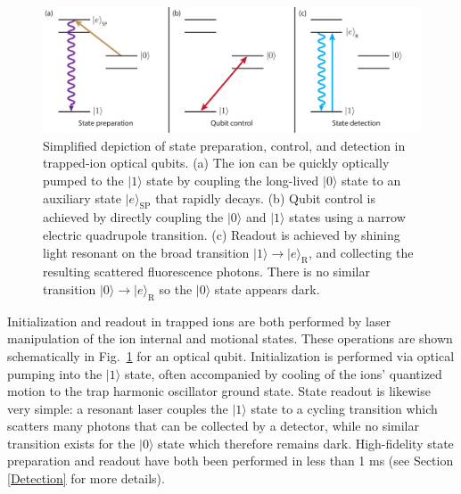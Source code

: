 \documentclass[%
12pt,
 amsmath,amssymb,
]{revtex4-2}
\newcommand{\zero}{|0 \rangle}
\newcommand{\one}{|1 \rangle}
\begin{document}
\begin{figure}[tp]
\includegraphics[width=0.9\columnwidth]{StatePrepv3.pdf}
\caption{Simplified depiction of state preparation, control, and detection in trapped-ion optical qubits. (a) The ion can be quickly optically pumped to the $\one$ state by coupling the long-lived $\zero$ state to an auxiliary state $|e\rangle_{\mathrm{SP}}$ that rapidly decays. (b) Qubit control is achieved by directly coupling the $\zero$ and $\one$ states using a narrow electric quadrupole transition. (c) Readout is achieved by shining light resonant on the broad transition $\one \rightarrow | e \rangle_{\mathrm{R}}$, and collecting the resulting scattered fluorescence photons. There is no similar transition $\zero \rightarrow | e \rangle_{\mathrm{R}}$ so the $\zero$ state appears dark.}
\label{fig:stateprep}
\end{figure}

Initialization and readout in trapped ions are both performed by laser manipulation of the ion internal and motional states. These operations are shown schematically in Fig.~\ref{fig:stateprep} for an optical qubit. Initialization is performed via optical pumping into the $\one$ state, often accompanied by cooling of the ions' quantized motion to the trap harmonic oscillator ground state.  State readout is likewise very simple: a resonant laser couples the $\one$ state to a cycling transition which scatters many photons that can be collected by a detector, while no similar transition exists for the $\zero$ state which therefore remains dark. High-fidelity state preparation and readout have both been performed in less than 1 ms \cite{MyersonReadoutIons2008, HartyHighFidelityIons2014, CrainSNSPDdetect2019} (see Section \ref{Detection} for more details).
\end{document}
